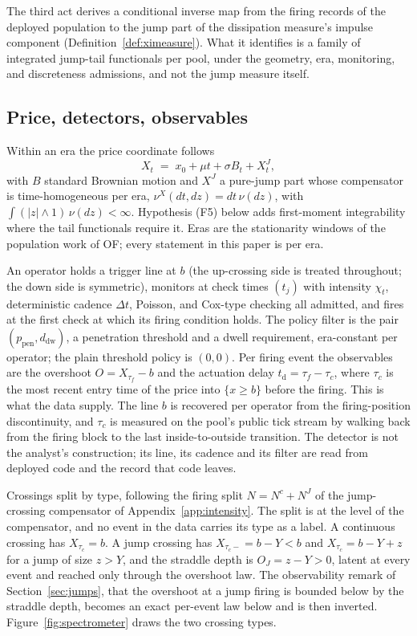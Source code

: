 \documentclass[11pt,a4paper]{article}
\theoremstyle{definition}
\theoremstyle{plain}
\theoremstyle{remark}
\newcommand{\tact}{t_{\mathrm{d}}}
\begin{document}
The third act derives a conditional inverse map from the firing records of the deployed population to the jump part of the dissipation measure's impulse component (Definition~\ref{def:ximeasure}). 
What it identifies is a family of integrated jump-tail functionals per pool, under the geometry, era, monitoring, and discreteness admissions, and not the jump measure itself.

\subsection{Price, detectors, observables}\label{sec:observables}

Within an era the price coordinate follows
\begin{equation}\label{eq:eramodel}
X_t \;=\; x_0 + \mu t + \sigma B_t + X^J_t,
\end{equation}
with $B$ standard Brownian motion and $X^J$ a pure-jump part whose compensator is time-homogeneous per era, $\nu^X(dt, dz) = dt\,
\nu(dz)$, with $\int (|z| \wedge 1)\, \nu(dz) < \infty$. 
Hypothesis (F5) below adds first-moment integrability where the tail functionals require it. Eras are the stationarity windows of the population work of OF; every statement in this paper is per era.

An operator holds a trigger line at $b$ (the up-crossing side is treated throughout; the down side is symmetric), monitors at check times $(t_j)$ with intensity $\chi_t$, 
deterministic cadence $\Delta t$, Poisson, and Cox-type checking all admitted, and fires at the first check at which its firing condition holds. The policy filter is the 
pair $(p_{\mathrm{pen}}, d_{\mathrm{dw}})$, a penetration threshold and a dwell requirement, era-constant per operator; the plain threshold policy is $(0, 0)$. Per firing 
event the observables are the overshoot $O = X_{\tau_f} - b$ and the actuation delay $\tact = \tau_f - \tau_c$, where $\tau_c$ is the most recent entry time of the price 
into $\{x \ge b\}$ before the firing. This is what the data supply. The line $b$ is recovered per operator from the firing-position discontinuity,\cite{ryan2026fingerprint} 
and $\tau_c$ is measured on the pool's public tick stream by walking back from the firing block to the last inside-to-outside transition. The detector is not the analyst's 
construction; its line, its cadence and its filter are read from deployed code and the record that code leaves.

Crossings split by type, following the firing split $N = N^{c} + N^{J}$ of the jump-crossing compensator of Appendix~\ref{app:intensity}. The split is at the level of the 
compensator, and no event in the data carries its type as a label. A continuous crossing has $X_{\tau_c} = b$. A jump crossing has $X_{\tau_c-} = b - Y < b$ and $X_{\tau_c} = b - Y + z$ 
for a jump of size $z > Y$, and the straddle depth is $O_J = z - Y > 0$, latent at every event and reached only through the overshoot law. The observability remark of Section~\ref{sec:jumps}, 
that the overshoot at a jump firing is bounded below by the straddle depth, becomes an exact per-event law below and is then inverted. Figure~\ref{fig:spectrometer} draws the two crossing types.
\end{document}
